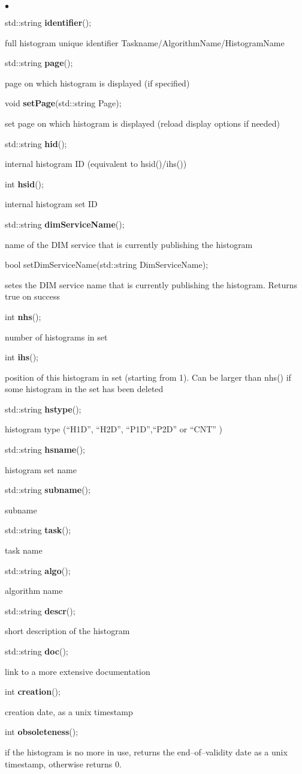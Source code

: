 \documentclass{lhcbnote}
\begin{document}
\begin{list}{$\bullet$}{}
\item   std::string {\bf identifier}();

full histogram unique identifier Taskname/AlgorithmName/HistogramName
\item   std::string {\bf page}();

page on which histogram is displayed (if specified)
\item void {\bf setPage}(std::string Page);

set page on which histogram is displayed (reload display options if needed)


\item   std::string {\bf hid}();

internal histogram ID (equivalent to hsid()/ihs())
\item   int {\bf hsid}();

internal histogram set ID
\item   std::string {\bf dimServiceName}();

name of the DIM service that is currently publishing the histogram 

\item bool setDimServiceName(std::string DimServiceName);

setes the DIM service name that is currently publishing the
histogram. Returns true on success

\item   int {\bf nhs}();

number of histograms in set
\item   int {\bf ihs}();

position of this histogram in set (starting from 1). Can be larger
than nhs() if some histogram in the set has been deleted
\item   std::string {\bf  hstype}();

histogram type (``H1D'', ``H2D'', ``P1D'',``P2D'' or ``CNT'' )
\item   std::string {\bf hsname}();

histogram set name
\item   std::string {\bf subname}();

subname 
\item   std::string {\bf task}();

task name
\item   std::string {\bf algo}();

algorithm name

\item   std::string {\bf descr}();

short description of the histogram
\item   std::string {\bf doc}();

link to a more extensive documentation

\item   int {\bf creation}();

creation date, as a unix timestamp
\item   int {\bf obsoleteness}();

if the histogram is no more in use, returns the end--of--validity date
as a unix timestamp, otherwise returns 0. 
\end{list}
\end{document}
